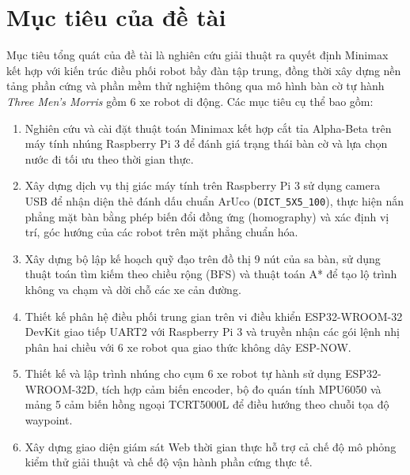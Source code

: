 \documentclass[12pt,a4paper]{report}
\begin{document}
	\section{Mục tiêu của đề tài}
	Mục tiêu tổng quát của đề tài là nghiên cứu giải thuật ra quyết định Minimax kết hợp với kiến trúc điều phối robot bầy đàn tập trung, đồng thời xây dựng nền tảng phần cứng và phần mềm thử nghiệm thông qua mô hình bàn cờ tự hành \textit{Three Men's Morris} gồm 6 xe robot di động. Các mục tiêu cụ thể bao gồm:
	\begin{enumerate}[leftmargin=1.2cm]
		\item Nghiên cứu và cài đặt thuật toán Minimax kết hợp cắt tỉa Alpha-Beta trên máy tính nhúng Raspberry Pi 3 để đánh giá trạng thái bàn cờ và lựa chọn nước đi tối ưu theo thời gian thực.
		\item Xây dựng dịch vụ thị giác máy tính trên Raspberry Pi 3 sử dụng camera USB để nhận diện thẻ đánh dấu chuẩn ArUco (\texttt{DICT\_5X5\_100}), thực hiện nắn phẳng mặt bàn bằng phép biến đổi đồng ứng (homography) và xác định vị trí, góc hướng của các robot trên mặt phẳng chuẩn hóa.
		\item Xây dựng bộ lập kế hoạch quỹ đạo trên đồ thị 9 nút của sa bàn, sử dụng thuật toán tìm kiếm theo chiều rộng (BFS) và thuật toán A* để tạo lộ trình không va chạm và dời chỗ các xe cản đường.
		\item Thiết kế phân hệ điều phối trung gian trên vi điều khiển ESP32-WROOM-32 DevKit giao tiếp UART2 với Raspberry Pi 3 và truyền nhận các gói lệnh nhị phân hai chiều với 6 xe robot qua giao thức không dây ESP-NOW.
		\item Thiết kế và lập trình nhúng cho cụm 6 xe robot tự hành sử dụng ESP32-WROOM-32D, tích hợp cảm biến encoder, bộ đo quán tính MPU6050 và mảng 5 cảm biến hồng ngoại TCRT5000L để điều hướng theo chuỗi tọa độ waypoint.
		\item Xây dựng giao diện giám sát Web thời gian thực hỗ trợ cả chế độ mô phỏng kiểm thử giải thuật và chế độ vận hành phần cứng thực tế.
	\end{enumerate}
	
\end{document}
